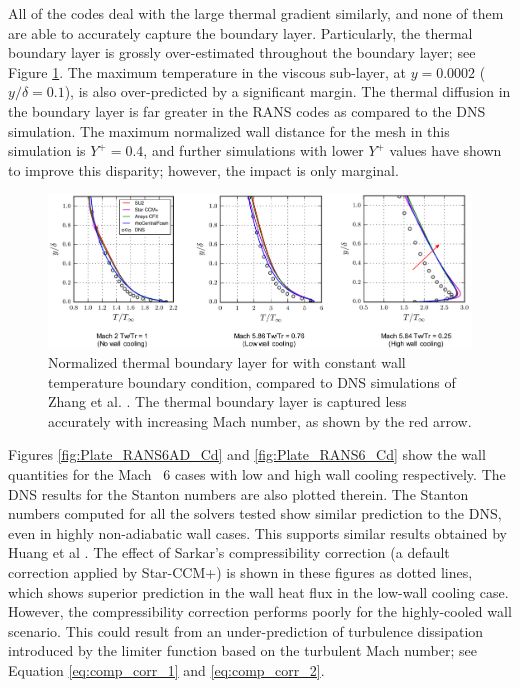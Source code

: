 \documentclass[journal ]{new-aiaa}
\begin{document}
All of the codes deal with the large thermal gradient similarly, and none of them are able to accurately capture the boundary layer. Particularly, the thermal boundary layer is grossly over-estimated throughout the boundary layer; see Figure \ref{fig:ThermalBL}. The maximum temperature in the viscous sub-layer, at $y = 0.0002$ ($y/\delta = 0.1$), is also over-predicted by a significant margin. The thermal diffusion in the boundary layer is far greater in the RANS codes as compared to the DNS simulation. The maximum normalized wall distance for the mesh in this simulation is $Y^+ = 0.4$,  and further simulations with lower $Y^+$ values have shown to improve this disparity; however, the impact is only marginal. 


\begin{figure}
\centering
    \includegraphics[width=\textwidth]{CHT/Thermal_Boundary_Layer.png}
  \caption{Normalized thermal boundary layer for with constant wall temperature boundary condition, compared to DNS simulations of Zhang et al. \cite{Zhang2018DNS}. The thermal boundary layer is captured less accurately with increasing Mach number, as shown by the red arrow.}
  \label{fig:ThermalBL}
\end{figure}

Figures \ref{fig:Plate_RANS6AD_Cd} and \ref{fig:Plate_RANS6_Cd} show the wall quantities for the Mach ~6 cases with low and high wall cooling respectively. The DNS results for the Stanton numbers are also plotted therein. The Stanton numbers computed for all the solvers tested show similar prediction to the DNS, even in highly non-adiabatic wall cases. This supports similar results obtained by Huang et al \cite{Huang2019}. The effect of Sarkar's compressibility correction (a default correction applied by Star-CCM+) is shown in these figures as dotted lines, which shows superior prediction in the wall heat flux in the low-wall cooling case. However, the compressibility correction performs poorly for the highly-cooled wall scenario. This could result from an under-prediction of turbulence dissipation introduced by the limiter function based on the turbulent Mach number; see Equation \eqref{eq:comp_corr_1} and \eqref{eq:comp_corr_2}.
\end{document}
